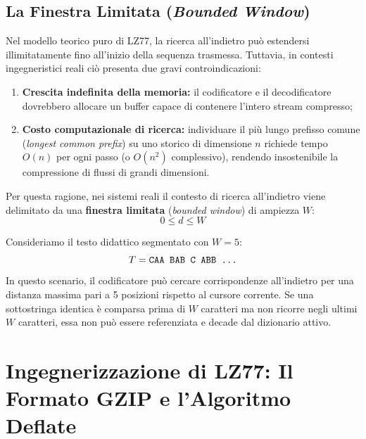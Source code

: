 \FloatBarrier
\subsection{La Finestra Limitata (\textit{Bounded Window})}
\label{subsec:lz77-bounded-window}

Nel modello teorico puro di LZ77, la ricerca all'indietro pu\`o estendersi illimitatamente fino all'inizio della sequenza trasmessa. Tuttavia, in contesti ingegneristici reali ci\`o presenta due gravi controindicazioni:
\begin{enumerate}
  \item \textbf{Crescita indefinita della memoria:} il codificatore e il decodificatore dovrebbero allocare un buffer capace di contenere l'intero stream compresso;
  \item \textbf{Costo computazionale di ricerca:} individuare il pi\`u lungo prefisso comune (\textit{longest common prefix}) su uno storico di dimensione $n$ richiede tempo $O(n)$ per ogni passo (o $O(n^2)$ complessivo), rendendo insostenibile la compressione di flussi di grandi dimensioni.
\end{enumerate}

Per questa ragione, nei sistemi reali il contesto di ricerca all'indietro viene delimitato da una \textbf{finestra limitata} (\textit{bounded window}) di ampiezza $W$:
\begin{equation}
  0 \le d \le W
\end{equation}

\begin{example}[Finestra di Dimensione $W = 5$]
Consideriamo il testo didattico segmentato con $W = 5$:
\begin{equation}
  T = \text{\texttt{CAA BAB C ABB \dots}}
\end{equation}
In questo scenario, il codificatore pu\`o cercare corrispondenze all'indietro per una distanza massima pari a 5 posizioni rispetto al cursore corrente. Se una sottostringa identica \`e comparsa prima di $W$ caratteri ma non ricorre negli ultimi $W$ caratteri, essa non pu\`o essere referenziata e decade dal dizionario attivo.
\end{example}

\FloatBarrier
\section{Ingegnerizzazione di LZ77: Il Formato GZIP e l'Algoritmo Deflate}
\label{sec:gzip-deflate}

